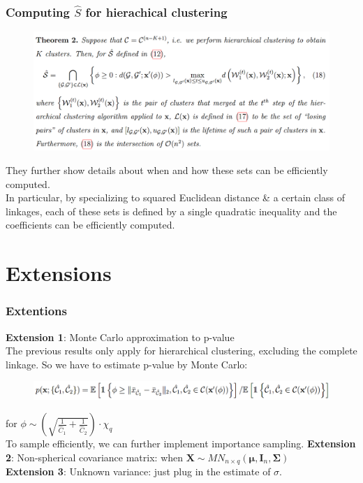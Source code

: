 \documentclass{beamer}
\begin{document}
	\begin{frame}
		\frametitle{Computing $\hat{S}$ for hierachical clustering}
		\begin{figure}
			\includegraphics[width=1\linewidth]{image020.png}
		\end{figure}
	They further show details about when and how these sets can be efficiently computed.\\
	In particular, by specializing to squared Euclidean distance \& a certain class of linkages, each of these sets is defined by a single quadratic inequality and the coefficients can be efficiently computed.
	\end{frame}
	
	\section{Extensions}
	
	\begin{frame}
		\frametitle{Extentions}
		\textbf{Extension 1}: Monte Carlo approximation to p-value\\
		The previous results only apply for hierarchical clustering, excluding the complete linkage. So we have to estimate p-value by Monte Carlo:
		\begin{figure}
			\includegraphics[width=1\linewidth]{image021.png}
		\end{figure}
		for $\phi\sim(\sqrt{\frac{1}{\hat{C}_1} + \frac{1}{\hat{C}_2}})\cdot\chi_{q}$\\
		To sample efficiently, we can further implement importance sampling.
		\textbf{Extension 2}: Non-spherical covariance matrix: 
		when $\bm{X}\sim MN_{n\times q}(\bm{\mu}, \bm{I}_n, \bm{\Sigma})$\\
		\textbf{Extension 3}: Unknown variance: 
		just plug in the estimate of $\sigma$.
	\end{frame}
	
\end{document}
